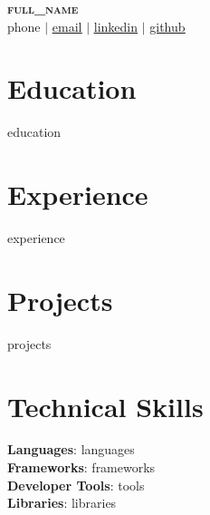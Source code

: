 \documentclass[letterpaper,11pt]{article}
\newcommand{\resumeSubHeadingListStart}{\begin{itemize}[leftmargin=0.15in, label={}]}
\newcommand{\resumeSubHeadingListEnd}{\end{itemize}}
\begin{document}
\begin{center}
    \textbf{\Huge \scshape {{full_name}}} \\ \vspace{1pt}
    \small {{phone}} $|$
    \href{mailto:{{email}}}{\underline{{{{email}}}}} $|$
    \href{https://{{linkedin}}}{\underline{{{{linkedin}}}}} $|$
    \href{https://{{github}}}{\underline{{{{github}}}}}
\end{center}

\section{Education}
  \resumeSubHeadingListStart
{{education}}
  \resumeSubHeadingListEnd

\section{Experience}
  \resumeSubHeadingListStart
{{experience}}
  \resumeSubHeadingListEnd

\section{Projects}
    \resumeSubHeadingListStart
{{projects}}
    \resumeSubHeadingListEnd

\section{Technical Skills}
 \begin{itemize}[leftmargin=0.15in, label={}]
    \small{\item{
     \textbf{Languages}{: {{languages}}} \\
     \textbf{Frameworks}{: {{frameworks}}} \\
     \textbf{Developer Tools}{: {{tools}}} \\
     \textbf{Libraries}{: {{libraries}}}
    }}
 \end{itemize}
\end{document}
